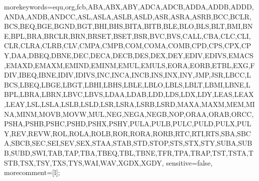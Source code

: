 

\usepackage[french]{babel}
\usepackage[latin1]{inputenc}
\usepackage{amsmath}
\usepackage{graphicx}
\usepackage{tikz}
\usepackage{fancybox}
\usepackage{pifont}

\usepackage{ifpdf}




\usepackage[absolute, overlay]{textpos}
\setlength{\TPHorizModule}{10mm}
\setlength{\TPVertModule}{\TPHorizModule}
\textblockorigin{0mm}{0mm} %



\usepackage{listings}

{morekeywords={equ,org,fcb,ABA,ABX,ABY,ADCA,ADCB,ADDA,ADDB,ADDD,ANDA,ANDB,ANDCC,ASL,ASLA,ASLB,ASLD,ASR,ASRA,ASRB,BCC,BCLR,BCS,BEQ,BGE,BGND,BGT,BHI,BHS,BITA,BITB,BLE,BLO,BLS,BLT,BMI,BNE,BPL,BRA,BRCLR,BRN,BRSET,BSET,BSR,BVC,BVS,CALL,CBA,CLC,CLI,CLR,CLRA,CLRB,CLV,CMPA,CMPB,COM,COMA,COMB,CPD,CPS,CPX,CPY,DAA,DBEQ,DBNE,DEC,DECA,DECB,DES,DEX,DEY,EDIV,EDIVS,EMACS,EMAXD,EMAXM,EMIND,EMINM,EMUL,EMULS,EORA,EORB,ETBL,EXG,FDIV,IBEQ,IBNE,IDIV,IDIVS,INC,INCA,INCB,INS,INX,INY,JMP,JSR,LBCC,LBCS,LBEQ,LBGE,LBGT,LBHI,LBHS,LBLE,LBLO,LBLS,LBLT,LBMI,LBNE,LBPL,LBRA,LBRN,LBVC,LBVS,LDAA,LDAB,LDD,LDS,LDX,LDY,LEAS,LEAX,LEAY,LSL,LSLA,LSLB,LSLD,LSR,LSRA,LSRB,LSRD,MAXA,MAXM,MEM,MINA,MINM,MOVB,MOVW,MUL,NEG,NEGA,NEGB,NOP,ORAA,ORAB,ORCC,PSHA,PSHB,PSHC,PSHD,PSHX,PSHY,PULA,PULB,PULC,PULD,PULX,PULY,REV,REVW,ROL,ROLA,ROLB,ROR,RORA,RORB,RTC,RTI,RTS,SBA,SBCA,SBCB,SEC,SEI,SEV,SEX,STAA,STAB,STD,STOP,STS,STX,STY,SUBA,SUBB,SUBD,SWI,TAB,TAP,TBA,TBEQ,TBL,TBNE,TFR,TPA,TRAP,TST,TSTA,TSTB,TSX,TSY,TXS,TYS,WAI,WAV,XGDX,XGDY},
sensitive=false,
morecomment=[l]{;}
}




